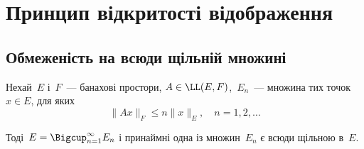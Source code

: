 \chapter{Принцип відкритості відображення}

\section{Обмеженість на всюди щільній множині}

\begin{lemma}
Нехай~$E$ і~$F$~--- банахові простори,
$A \in \LL(E, F)$,~$E_n$~--- множина тих точок~$x \in E$, для яких
\begin{equation*}
    \|A x\|_F \le n \|x\|_E, \quad n = 1, 2, \dots    
\end{equation*}

Тоді~$E = \Bigcup_{n = 1}^\infty E_n$ і принаймні одна із множин~$E_n$ є всюди
щільною в~$E$.
\end{lemma}

